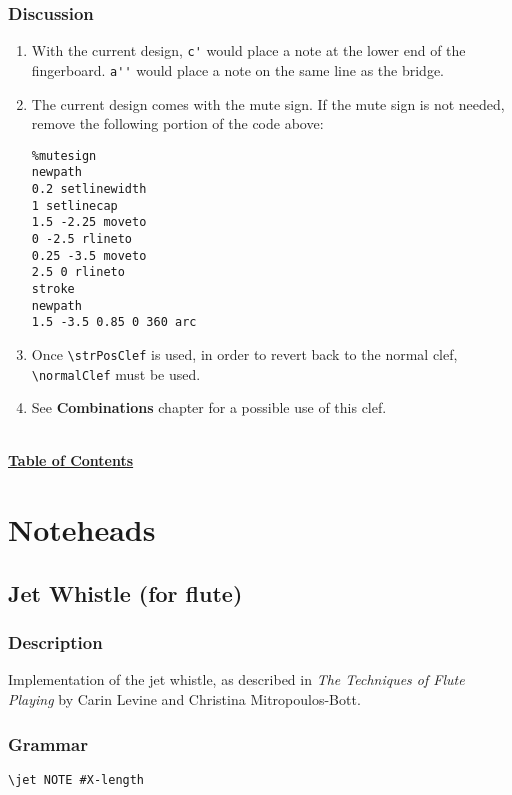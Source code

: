 \documentclass[11pt, oneside]{book}   	%
\begin{document}
\subsection{Discussion}
\begin{enumerate}
\item With the current design, \verb|c'| would place a note at the lower end of the fingerboard. \verb|a''| would place a note on the same line as the bridge. 

\item The current design comes with the mute sign. If the mute sign is not needed, remove the following portion of the code above:

\begin{verbatim}
%mutesign
newpath
0.2 setlinewidth
1 setlinecap
1.5 -2.25 moveto
0 -2.5 rlineto
0.25 -3.5 moveto
2.5 0 rlineto
stroke
newpath
1.5 -3.5 0.85 0 360 arc
\end{verbatim}

\item Once \verb|\strPosClef| is used, in order to revert back to the normal clef, \verb|\normalClef| must be used.
\item See \textbf{Combinations} chapter for a possible use of this clef.
\end{enumerate}

\hyperref[sec:toc]{\\ \textbf{Table of Contents}}

\vfill \break



\chapter {Noteheads}



\section {Jet Whistle (for flute)}
\hfill

\subsection{Description}
Implementation of the jet whistle, as described in \textit{The Techniques of Flute Playing} by Carin Levine and Christina Mitropoulos-Bott.\autocite[18]{RN1695} 

\subsection{Grammar}
\begin{verbatim}
\jet NOTE #X-length
\end{verbatim}
\end{document}

